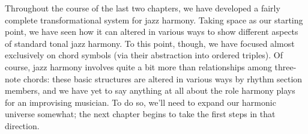 Throughout the course of the last two chapters, we have developed a fairly
complete transformational system for jazz harmony. Taking \tf space as our
starting point, we have seen how it can altered in various ways to show
different aspects of standard tonal jazz harmony. To this point, though, we
have focused almost exclusively on chord symbols (via their abstraction into
ordered triples). Of course, jazz harmony involves quite a bit more than
relationships among three-note chords: these basic structures are altered in
various ways by rhythm section members, and we have yet to say anything at all
about the role harmony plays for an improvising musician. To do so, we'll need
to expand our harmonic universe somewhat; the next chapter begins to take the
first steps in that direction.

